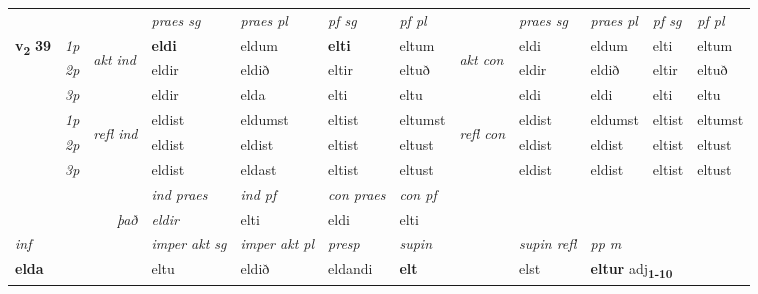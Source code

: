\begin{longtable}[l]{X>{\footnotesize\itshape}llXXXXlXXXX}
 & &   & \textit{praes sg}  & \textit{praes pl}    & \textit{ pf sg} & \textit{pf pl} & & \textit{praes sg}  & \textit{praes pl}    & \textit{pf sg} & \textit{pf pl }  \\ \cmidrule{4-7} \cmidrule{9-12}
 \multirow{2}{*}{{{\textbf{v{\textsubscript{2}}} \Large{\textbf{39}}}}}  & 1p & \multirow{3}{*}{\begin{turn}{90}\textit{akt ind}\end{turn}} & \textbf{eldi} & eldum & \textbf{elti} & eltum & \multirow{3}{*}{\begin{turn}{90}\textit{akt con}\end{turn}} &eldi & eldum & elti & eltum\\*
 & 2p &  &  eldir  & eldið & eltir & eltuð & & eldir & eldið & eltir & eltuð \\*
 & 3p &  & eldir & elda & elti & eltu & & eldi & eldi& elti & eltu \\*
\cmidrule{4-7} \cmidrule{9-12}
 & 1p & \multirow{3}{*}{\begin{turn}{90}\textit{refl ind}\end{turn}}  & eldist & eldumst & eltist & eltumst & \multirow{3}{*}{\begin{turn}{90}\textit{refl con}\end{turn}}  &eldist & eldumst & eltist & eltumst \\*
 & 2p &  & eldist & eldist & eltist & eltust & &eldist & eldist & eltist & eltust \\*
 & 3p  & & eldist & eldast & eltist & eltust & & eldist & eldist& eltist & eltust \\*
\cmidrule{4-7} \cmidrule{9-12}

   && &  \textit{ind praes} & \textit{ind pf} & \textit{con praes} & \textit{con pf} \\*
\multicolumn{3}{r}{\textit{það}} & eldir & elti & eldi & elti \\*

\cmidrule{4-7}
   {\textit{inf}} & &  & \textit{imper akt sg} & \textit{imper akt pl}   & \textit{presp} & \textit{supin} && \textit{supin refl} & \textit{pp m} \\*
  {\textbf{elda}} & && eltu  & eldið   & eldandi &  \textbf{elt} && elst & \multicolumn{2}{l}{\textbf{eltur} adj\textbf{\textsubscript{1-10}}} \\*

\midrule


\end{longtable}
